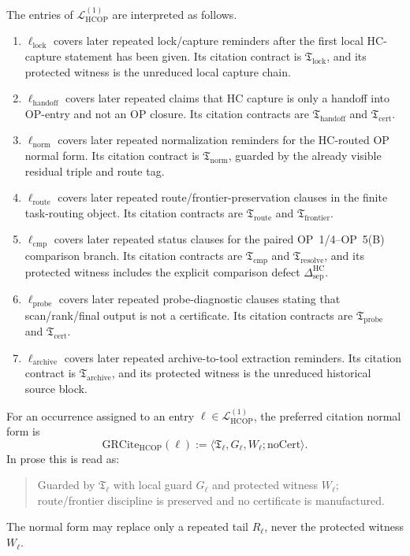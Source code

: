 \begin{definition}
\label{def:r12-guarded-citation-sites}
The entries of \(\mathcal L_{\mathrm{HCOP}}^{(1)}\) are interpreted as follows.
\begin{enumerate}[leftmargin=2em,label=(\roman*)]
 \item \(\ell_{\mathrm{lock}}\) covers later repeated lock/capture reminders after the first local HC-capture statement has been given. Its citation contract is \(\mathfrak T_{\mathrm{lock}}\), and its protected witness is the unreduced local capture chain.
 \item \(\ell_{\mathrm{handoff}}\) covers later repeated claims that HC capture is only a handoff into OP-entry and not an OP closure. Its citation contracts are \(\mathfrak T_{\mathrm{handoff}}\) and \(\mathfrak T_{\mathrm{cert}}\).
 \item \(\ell_{\mathrm{norm}}\) covers later repeated normalization reminders for the HC-routed OP normal form. Its citation contract is \(\mathfrak T_{\mathrm{norm}}\), guarded by the already visible residual triple and route tag.
 \item \(\ell_{\mathrm{route}}\) covers later repeated route/frontier-preservation clauses in the finite task-routing object. Its citation contracts are \(\mathfrak T_{\mathrm{route}}\) and \(\mathfrak T_{\mathrm{frontier}}\).
 \item \(\ell_{\mathrm{cmp}}\) covers later repeated status clauses for the paired OP~1/4--OP~5(B) comparison branch. Its citation contracts are \(\mathfrak T_{\mathrm{cmp}}\) and \(\mathfrak T_{\mathrm{resolve}}\), and its protected witness includes the explicit comparison defect \(\Delta_{\mathrm{sep}}^{\mathrm{HC}}\).
 \item \(\ell_{\mathrm{probe}}\) covers later repeated probe-diagnostic clauses stating that scan/rank/final output is not a certificate. Its citation contracts are \(\mathfrak T_{\mathrm{probe}}\) and \(\mathfrak T_{\mathrm{cert}}\).
 \item \(\ell_{\mathrm{archive}}\) covers later repeated archive-to-tool extraction reminders. Its citation contract is \(\mathfrak T_{\mathrm{archive}}\), and its protected witness is the unreduced historical source block.
\end{enumerate}
\end{definition}

\begin{definition}
\label{def:ledger-citation-normal-form}
For an occurrence assigned to an entry \(\ell\in\mathcal L_{\mathrm{HCOP}}^{(1)}\), the preferred citation normal form is
\[
 \mathrm{GRCite}_{\mathrm{HCOP}}(\ell)
 :=
 \langle \mathfrak T_{\ell},G_{\ell},W_{\ell};\mathrm{noCert}\rangle.
\]
In prose this is read as:
\begin{quote}\small
Guarded by \(\mathfrak T_{\ell}\) with local guard \(G_{\ell}\) and protected witness \(W_{\ell}\); route/frontier discipline is preserved and no certificate is manufactured.
\end{quote}
The normal form may replace only a repeated tail \(R_{\ell}\), never the protected witness \(W_{\ell}\).
\end{definition}


